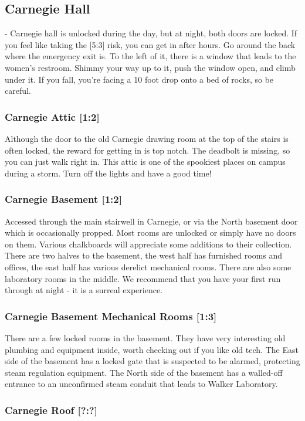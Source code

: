 \documentclass{article}
\begin{document}
\pagebreak
\subsection{Carnegie Hall}
- Carnegie hall is unlocked during the day, but at night, both doors are locked. If you feel like taking the [5:3] risk, you can get in after hours. Go around the back where the emergency exit is. To the left of it, there is a window that leads to the women's restroom. Shimmy your way up to it, push the window open, and climb under it. If you fall, you’re facing a 10 foot drop onto a bed of rocks, so be careful.

\subsubsection{Carnegie Attic [1:2]}
Although the door to the old Carnegie drawing room at the top of the stairs is often locked, the reward for getting in is top notch. The deadbolt is missing, so you can just walk right in. This attic is one of the spookiest places on campus during a storm. Turn off the lights and have a good time!
\subsubsection{Carnegie Basement [1:2]}
Accessed through the main stairwell in Carnegie, or via the North basement door which is occasionally propped. Most rooms are unlocked or simply have no doors on them. Various chalkboards will appreciate some additions to their collection. There are two halves to the basement, the west half has furnished rooms and offices, the east half has various derelict mechanical rooms. There are also some laboratory rooms in the middle. We recommend that you have your first run through at night - it is a surreal experience.
\subsubsection{Carnegie Basement Mechanical Rooms [1:3]}
There are a few locked rooms in the basement. They have very interesting old plumbing and equipment inside, worth checking out if you like old tech. The East side of the basement has a locked gate that is suspected to be alarmed, protecting steam regulation equipment. The North side of the basement has a walled-off entrance to an unconfirmed steam conduit that leads to Walker Laboratory.
\subsubsection{Carnegie Roof [?:?]}
\end{document}
